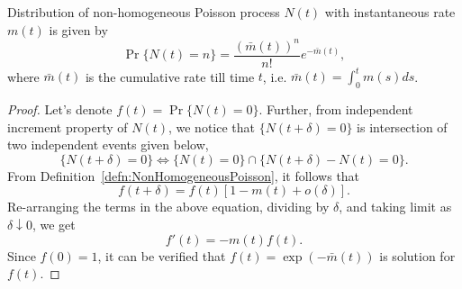 \documentclass[a4paper,10pt]{article}
\begin{document}
\begin{prop} Distribution of non-homogeneous Poisson process $N(t)$ with instantaneous rate $m(t)$ is given by
 \begin{equation*}
 \Pr\{N(t)=n\}=\frac{(\bar{m}(t))^n}{n!}e^{-\bar{m}(t)},
 \end{equation*}
where $\bar{m}(t)$ is the cumulative rate till time $t$, i.e. $\bar{m}(t)=\int_{0}^{t}m(s)ds$. 
\end{prop}
\begin{proof}
Let's denote $f(t) = \Pr\{N(t)=0\}$. Further, from independent increment property of $N(t)$, we notice that $\{N(t+\delta) = 0\}$ is intersection of two independent events given below, 
\begin{equation*}
\{N(t+\delta)=0\} \iff \{N(t)=0\}\cap\{N(t+\delta)-N(t)=0\}.
\end{equation*}
From Definition~\ref{defn:NonHomogeneousPoisson}, it follows that
\begin{equation*}
 f(t+\delta) = f(t)[1 - m(t) + o(\delta)].
\end{equation*}
Re-arranging the terms in the above equation, dividing by $\delta$, and taking limit as $\delta \downarrow 0$, we get 
\begin{equation*}
f'(t) = -m(t)f(t).
\end{equation*}
Since $f(0) = 1$, it can be verified that $f(t) = \exp(-\bar{m}(t))$ is solution for $f(t)$.


\end{proof}
\end{document}
